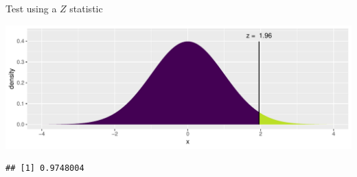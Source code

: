 \documentclass[handout]{beamer}\usepackage[]{graphicx}\usepackage[]{color}
\newenvironment{knitrout}{}{} %
\begin{document}
\begin{frame}[fragile]{Test using a $Z$ statistic}
\begin{itemize}
\begin{knitrout}
{\centering \includegraphics[width=1\linewidth]{figure/unnamed-chunk-2-1} 

}


\begin{verbatim}
## [1] 0.9748004
\end{verbatim}

\end{knitrout}
	
\end{itemize}
\end{frame}
\end{document}
